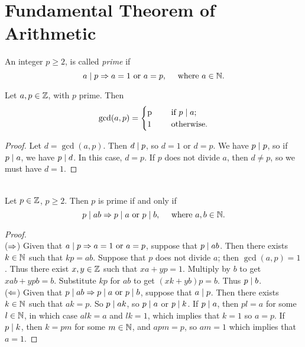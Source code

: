 \documentclass{amsart}
\begin{document}
\newpage

\section{Fundamental Theorem of Arithmetic}

\begin{Def}
An integer $p \ge 2$, is called {\em prime} if
\[ a \mid p \Rightarrow a = 1 \text{ or } a = p, \quad \text{ where } a \in \mathbb{N} . \]
\end{Def}

\begin{Prop}
Let $a,p \in \mathbb{Z}$, with $p$ prime.  Then
\[ \gcd(a,p) =
\begin{cases}
    $p$ & \quad \text{ if $p \divides a$} ; \\
    $1$ & \quad \text{ otherwise}.
\end{cases} \]
\end{Prop}

\begin{proof}
Let $d = \gcd(a,p)$.  Then $d \mid p$, so $d = 1$ or $d = p$.
We have $p \mid p$, so if $p \mid a$, we have $p \mid d$.
In this case, $d = p$.
If $p$ does not divide $a$, then $d \ne p$, so we must have $d = 1$.
\end{proof}

\begin{Prop}  \\
Let $p \in \mathbb{Z}$, $p \ge 2$. Then $p$ is prime if and only if
\[ p \mid ab \Rightarrow p \mid a \text{ or } p \mid b, \quad \text{ where } a,b \in \mathbb{N} . \]
\end{Prop}

\begin{proof}
\text{ } \\
($\Rightarrow$) Given that $a \mid p \Rightarrow a = 1 \text{ or } a = p$,
suppose that $p \mid ab$. Then there exists $k \in \mathbb{N}$ such
that $kp = ab$. Suppose that $p$ does not divide $a$; then
$\gcd(a,p) = 1$. Thus there exist $x,y \in \mathbb{Z}$ such that $xa + yp
= 1$. Multiply by $b$ to get $xab + ypb = b$. Substitute $kp$ for
$ab$ to get $(xk + yb)p = b$.
Thus $p \mid b$. \\
($\Leftarrow$) Given that $p \mid ab \Rightarrow p \mid a \text{ or } p
\mid b$, suppose that $a \mid p$. Then there exists $k \in
\mathbb{N}$ such that $ak = p$. So $p \mid ak$, so $p \mid a$ or
$p \mid k$. If $p \mid a$, then $pl = a$ for some $l \in
\mathbb{N}$, in which case $alk = a$ and $lk = 1$, which implies that $k
= 1$ so $a = p$. If $p \mid k$, then $k = pm$ for some $m \in
\mathbb{N}$, and $apm = p$, so $am = 1$ which implies that $a = 1$.
\end{proof}
\end{document}
